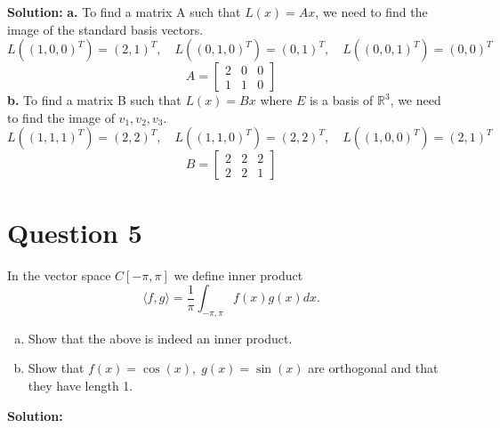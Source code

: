 \documentclass{article}
\begin{document}
\noindent\textbf{Solution:}
\newline\noindent\textbf{a.} To find a matrix A such that $L(x) = Ax$, we need to find the image of the standard basis vectors.
$$ L((1, 0, 0)^T) = (2, 1)^T, \quad L((0, 1, 0)^T) = (0, 1)^T, \quad L((0, 0, 1)^T) = (0, 0)^T $$
$$ A = \begin{bmatrix} 2 & 0 & 0 \\ 1 & 1 & 0 \end{bmatrix} $$
\noindent\textbf{b.} To find a matrix B such that $L(x) = Bx$ where $E$ is a basis of $\mathbb{R}^3$, we need to find the image of $v_1, v_2, v_3$.
$$ L((1, 1, 1)^T) = (2, 2)^T, \quad L((1, 1, 0)^T) = (2, 2)^T, \quad L((1, 0, 0)^T) = (2, 1)^T $$
$$ B = \begin{bmatrix} 2 & 2 & 2 \\ 2 & 2 & 1 \end{bmatrix} $$

\section*{Question 5}
In the vector space $C[-\pi, \pi]$ we define inner product
$$ \langle f, g \rangle = \frac{1}{\pi} \int_{-\pi, \pi} f(x)g(x)dx. $$
\begin{enumerate}[a.]
    \item Show that the above is indeed an inner product.
    \item Show that $f(x) = \cos(x), \; g(x) = \sin(x)$ are orthogonal and that they have length 1.
\end{enumerate}

\noindent\textbf{Solution:}
\end{document}
